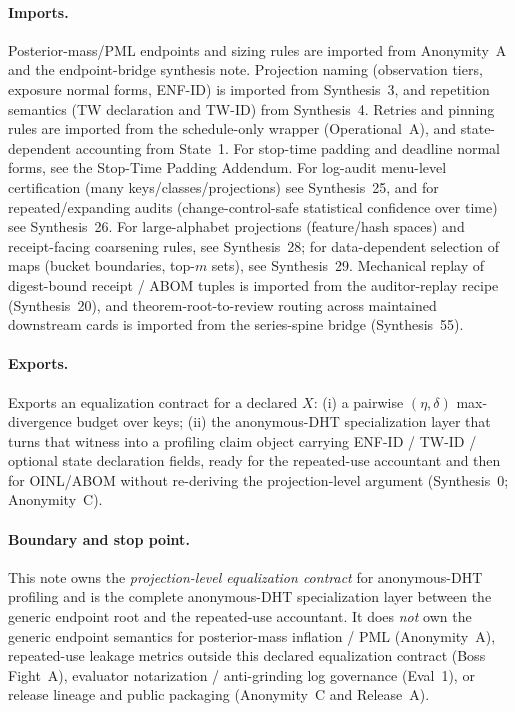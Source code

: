 \documentclass[11pt]{article}
\begin{document}
\paragraph{Imports.}
Posterior-mass/PML endpoints and sizing rules are imported from Anonymity~A and the endpoint-bridge synthesis note.\cite{series:oddsinflation,series:endpointbridge}
Projection naming (observation tiers, exposure normal forms, ENF-ID) is imported from Synthesis~3, and repetition semantics (TW declaration and TW-ID) from Synthesis~4.\cite{series:traceifaces,series:threatwindows}
Retries and pinning rules are imported from the schedule-only wrapper (Operational~A), and state-dependent accounting from State~1.\cite{series:operationalA,series:state1}
For stop-time padding and deadline normal forms, see the Stop-Time Padding Addendum.\cite{series:stoptimeaddendum}
For log-audit menu-level certification (many keys/classes/projections) see Synthesis~25, and for repeated/expanding audits (change-control-safe statistical confidence over time) see Synthesis~26.\cite{series:stataudit,series:anytimespend}
For large-alphabet projections (feature/hash spaces) and receipt-facing coarsening rules, see Synthesis~28; for data-dependent selection of maps (bucket boundaries, top-$m$ sets), see Synthesis~29.\cite{series:coarsening,series:selectiondiscipline}
Mechanical replay of digest-bound receipt / ABOM tuples is imported from the auditor-replay recipe (Synthesis~20), and theorem-root-to-review routing across maintained downstream cards is imported from the series-spine bridge (Synthesis~55).\cite{series:replayrecipe,series:seriesspines}

\paragraph{Exports.}
Exports an equalization contract for a declared $X$:
(i) a pairwise $(\eta,\delta)$ max-divergence budget over keys;
(ii) the anonymous-DHT specialization layer that turns that witness into a profiling claim object carrying ENF-ID / TW-ID / optional state declaration fields, ready for the repeated-use accountant and then for OINL/ABOM without re-deriving the projection-level argument (Synthesis~0; Anonymity~C).\cite{series:contractobjects,series:abomoinl}

\paragraph{Boundary and stop point.}
This note owns the \emph{projection-level equalization contract} for anonymous-DHT profiling and is the complete anonymous-DHT specialization layer between the generic endpoint root and the repeated-use accountant.
It does \emph{not} own the generic endpoint semantics for posterior-mass inflation / PML (Anonymity~A), repeated-use leakage metrics outside this declared equalization contract (Boss Fight~A), evaluator notarization / anti-grinding log governance (Eval~1), or release lineage and public packaging (Anonymity~C and Release~A).\cite{series:oddsinflation,series:bossfightA,series:eval1,series:abomoinl,series:releaseA}
\end{document}
